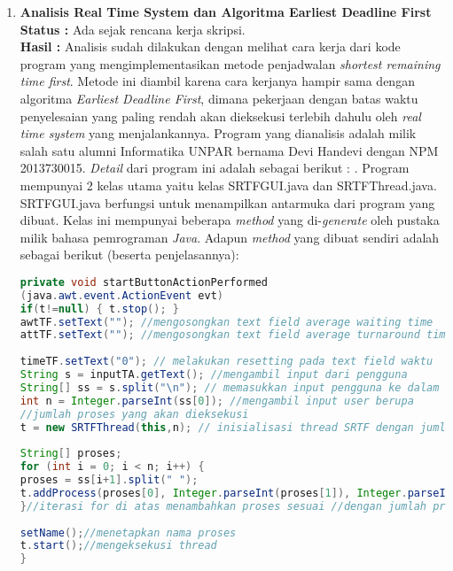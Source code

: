 \documentclass[a4paper,twoside]{article}
\begin{document}
\begin{enumerate}
		\item \textbf{Analisis Real Time System dan Algoritma Earliest Deadline First}\\
		{\bf Status :} Ada sejak rencana kerja skripsi.\\
		{\bf Hasil : }\newline
		Analisis sudah dilakukan dengan melihat cara kerja dari kode program yang mengimplementasikan metode penjadwalan {\it shortest remaining time first}. Metode ini diambil karena cara kerjanya hampir sama dengan algoritma {\it Earliest Deadline First}, dimana pekerjaan dengan batas waktu penyelesaian yang paling rendah akan dieksekusi terlebih dahulu oleh {\it real time system} yang menjalankannya. Program yang dianalisis adalah milik salah satu alumni Informatika UNPAR bernama Devi Handevi dengan NPM 2013730015. {\it Detail} dari program ini adalah sebagai berikut : . Program mempunyai 2 kelas utama yaitu kelas SRTFGUI.java dan SRTFThread.java. SRTFGUI.java berfungsi untuk menampilkan antarmuka dari program yang dibuat. Kelas ini mempunyai beberapa {\it method} yang di-{\it generate} oleh pustaka milik bahasa  pemrograman {\it Java}. Adapun {\it method} yang dibuat sendiri adalah sebagai berikut (beserta penjelasannya):\newline
		\begin{lstlisting}[language=Java]
private void startButtonActionPerformed
(java.awt.event.ActionEvent evt) 
if(t!=null) { t.stop(); }
awtTF.setText(""); //mengosongkan text field average waiting time
attTF.setText(""); //mengosongkan text field average turnaround time
        
timeTF.setText("0"); // melakukan resetting pada text field waktu
String s = inputTA.getText(); //mengambil input dari pengguna
String[] ss = s.split("\n"); // memasukkan input pengguna ke dalam sebuah array
int n = Integer.parseInt(ss[0]); //mengambil input user berupa
//jumlah proses yang akan dieksekusi
t = new SRTFThread(this,n); // inisialisasi thread SRTF dengan jumlah proses N
        
String[] proses; 
for (int i = 0; i < n; i++) {
proses = ss[i+1].split(" ");
t.addProcess(proses[0], Integer.parseInt(proses[1]), Integer.parseInt(proses[2]));
}//iterasi for di atas menambahkan proses sesuai //dengan jumlah proses dari masukan pengguna
        
setName();//menetapkan nama proses
t.start();//mengeksekusi thread
}


\end{lstlisting}
\end{enumerate}
\end{document}
